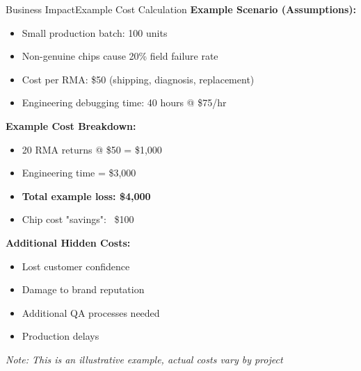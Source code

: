 \documentclass{beamer}
\begin{document}
\begin{frame}{Business Impact}{Example Cost Calculation}
	\textbf{Example Scenario (Assumptions):}
	\begin{itemize}
		\item Small production batch: 100 units
		\item Non-genuine chips cause 20\% field failure rate
		\item Cost per RMA: \$50 (shipping, diagnosis, replacement)
		\item Engineering debugging time: 40 hours @ \$75/hr
	\end{itemize}
	
	\medskip
	\textbf{Example Cost Breakdown:}
	\begin{itemize}
		\item 20 RMA returns @ \$50 = \$1,000
		\item Engineering time = \$3,000
		\item \textbf{Total example loss: \$4,000}
		\item Chip cost "savings": ~\$100
	\end{itemize}
	
	\medskip
	\textbf{Additional Hidden Costs:}
	\begin{itemize}
		\item Lost customer confidence
		\item Damage to brand reputation
		\item Additional QA processes needed
		\item Production delays
	\end{itemize}
	
	\medskip
	\textit{Note: This is an illustrative example, actual costs vary by project}
\end{frame}
\end{document}
